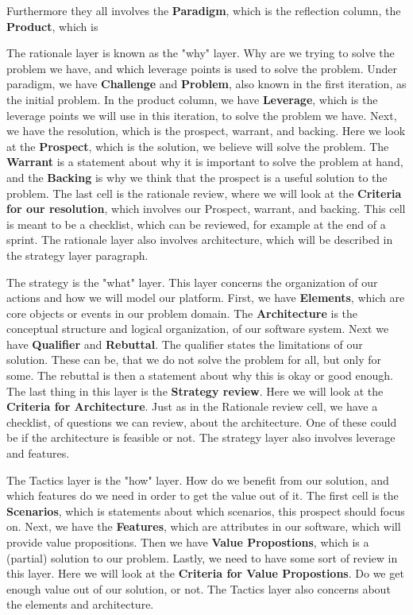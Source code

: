 Furthermore they all involves the \textbf{Paradigm}, which is the reflection column, the \textbf{Product}, which is 

The rationale layer is known as the "why" layer.
Why are we trying to solve the problem we have, and which leverage points is used to solve the problem.
Under paradigm, we have \textbf{Challenge} and \textbf{Problem}, also known in the first iteration, as the initial problem.
In the product column, we have \textbf{Leverage}, which is the leverage points we will use in this iteration, to solve the problem we have.
Next, we have the resolution, which is the prospect, warrant, and backing. 
Here we look at the \textbf{Prospect}, which is the solution, we believe will solve the problem.
The \textbf{Warrant} is a statement about why it is important to solve the problem at hand, and the \textbf{Backing} is why we think that the prospect is a useful solution to the problem.
The last cell is the rationale review, where we will look at the \textbf{Criteria for our resolution}, which involves our Prospect, warrant, and backing.
This cell is meant to be a checklist, which can be reviewed, for example at the end of a sprint.
The rationale layer also involves architecture, which will be described in the strategy layer paragraph.

The strategy is the "what" layer.
This layer concerns the organization of our actions and how we will model our platform.
First, we have \textbf{Elements}, which are core objects or events in our problem domain.
The \textbf{Architecture} is the conceptual structure and logical organization, of our software system.
Next we have \textbf{Qualifier} and \textbf{Rebuttal}.
The qualifier states the limitations of our solution.
These can be, that we do not solve the problem for all, but only for some.
The rebuttal is then a statement about why this is okay or good enough.
The last thing in this layer is the \textbf{Strategy review}.
Here we will look at the \textbf{Criteria for Architecture}.
Just as in the Rationale review cell, we have a checklist, of questions we can review, about the architecture.
One of these could be if the architecture is feasible or not.
The strategy layer also involves leverage and features.

The Tactics layer is the "how" layer.
How do we benefit from our solution, and which features do we need in order to get the value out of it.
The first cell is the \textbf{Scenarios}, which is statements about which scenarios, this prospect should focus on.
Next, we have the \textbf{Features}, which are attributes in our software, which will provide value propositions.
Then we have \textbf{Value Propostions}, which is a (partial) solution to our problem.
Lastly, we need to have some sort of review in this layer.
Here we will look at the \textbf{Criteria for Value Propostions}.
Do we get enough value out of our solution, or not.
The Tactics layer also concerns about the elements and architecture.

